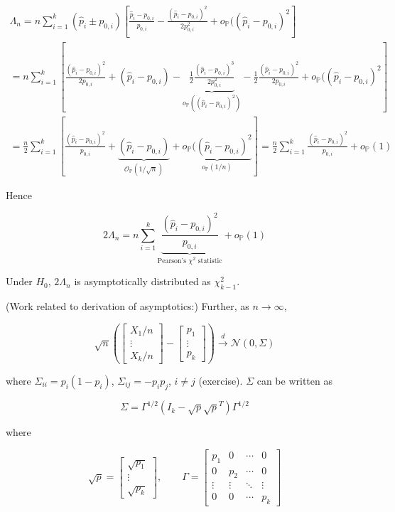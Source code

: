 \begin{example}
\begin{multline*}
\Lambda_n = n \sum_{i=1}^k(\hat{p}_i \pm p_{0,i}) \left[  \frac{\hat{p}_i - p_{0,i}}{p_{0,i}} - \frac{(\hat{p}_i -p_{0,i})^2}{2 p_{0,i}^2} + o_{\mathbb{P}}((\hat{p}_i - p_{0,i})^2 \right]
\\ = n \sum_{i=1}^k \left[  \frac{(\hat{p}_i -p_{0,i})^2}{2 p_{0,i}} + (\hat{p}_i - p_{0,i}) - \underbrace{\frac{1}{2} \frac{(\hat{p}_i -p_{0,i})^3}{2 p_{0,i}^2} }_{o_\mathbb{P}((\hat{p}_i - p_{0,i})^2)} - \frac{1}{2}  \frac{(\hat{p}_i -p_{0,i})^2}{2 p_{0,i}}  +  o_{\mathbb{P}}((\hat{p}_i - p_{0,i})^2 \right]
\\ = \frac{n}{2}  \sum_{i=1}^k \left[  \frac{(\hat{p}_i -p_{0,i})^2}{ p_{0,i}} + \underbrace{(\hat{p}_i - p_{0,i})}_{\mathcal{O}_{\mathbb{P}}(1/\sqrt{n})}  +  \underbrace{o_{\mathbb{P}}((\hat{p}_i - p_{0,i})^2}_{o_{\mathbb{P}}(1/n)} \right] 
= \frac{n}{2}  \sum_{i=1}^k \frac{(\hat{p}_i -p_{0,i})^2}{ p_{0,i}}  +  o_{\mathbb{P}}(1) 
\end{multline*}

Hence

\[
2\Lambda_n =  n \sum_{i=1}^k \underbrace{\frac{(\hat{p}_i -p_{0,i})^2}{ p_{0,i}} }_{\text{Pearson's } \chi^2 \text{ statistic}} +  o_{\mathbb{P}}(1) 
\]

Under \(H_0\), \(2 \Lambda_n\) is asymptotically distributed as \(\chi_{k-1}^2\).

(Work related to derivation of asymptotics:) Further, as \( n \to \infty\),

\[
\sqrt{n} \left( \begin{bmatrix}
X_1/n \\
\vdots \\
X_k/n \end{bmatrix} -   \begin{bmatrix}
p_1  \\
\vdots \\
p_k \end{bmatrix} \right) \xrightarrow{d} \mathcal{N}(0, \Sigma)
\]

where \(\Sigma_{ii} = p_i(1-p_i)\), \(\Sigma_{ij} = - p_ip_j\), \(i \neq j\) (exercise). \(\Sigma\) can be written as 

\[
\Sigma = \Gamma^{1/2}(I_k - \sqrt{p} \sqrt{p}^T) \Gamma^{1/2}
\]

where

\[
\sqrt{p} = \begin{bmatrix}
\sqrt{p_1} \\
\vdots \\
\sqrt{p_k}
\end{bmatrix}, \qquad \Gamma = \begin{bmatrix}
p_1 & 0 & \cdots & 0 \\
0 & p_2 & \cdots & 0 \\
\vdots & \vdots & \ddots & \vdots \\
0 & 0 & \cdots & p_k
\end{bmatrix}
\]


\end{example}
